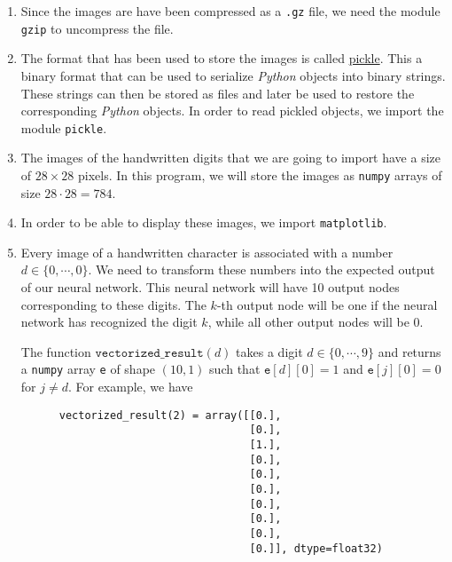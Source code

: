 \begin{enumerate}
\item Since the images are have been compressed as a \texttt{.gz} file, we need the module \texttt{gzip} to
      uncompress the file.
\item The format that has been used to store the images is called
      \href{https://docs.python.org/3.6/library/pickle.html}{pickle}.
      This a binary format that can be used to serialize \textsl{Python} objects into binary strings.  These
      strings can then be stored as files and later be used to restore the corresponding \textsl{Python} objects.  In order
      to read pickled objects, we import the module \texttt{pickle}.
\item The images of the handwritten digits that we are going to import have a size of $28 \times 28$ pixels.
      In this program, we will store the images as \texttt{numpy} arrays of size $28 \cdot 28 = 784$.
\item In order to be able to display these images, we import \texttt{matplotlib}.
\item Every image of a handwritten character is associated with a number $d \in \{0, \cdots, 0\}$.
      We need to transform these numbers into the expected output of our neural network.  This neural network
      will have 10 output nodes corresponding to these digits.  The $k$-th output node will be one
      if the neural network has recognized the digit $k$, while all other output nodes will be $0$.

      The function $\texttt{vectorized\_result}(d)$ takes a digit $d \in \{0,\cdots,9\}$ and returns a
      \texttt{numpy} array \texttt{e} of shape $(10, 1)$ such that $\texttt{e}[d][0]=1$ and $\texttt{e}[j][0]=0$ for
      $j\not=d$.  For example, we have
      \begin{verbatim}
      vectorized_result(2) = array([[0.],
                                    [0.],
                                    [1.],
                                    [0.],
                                    [0.],
                                    [0.],
                                    [0.],
                                    [0.],
                                    [0.],
                                    [0.]], dtype=float32)
      \end{verbatim}
      \vspace*{-0.5cm}
      

\end{enumerate}
